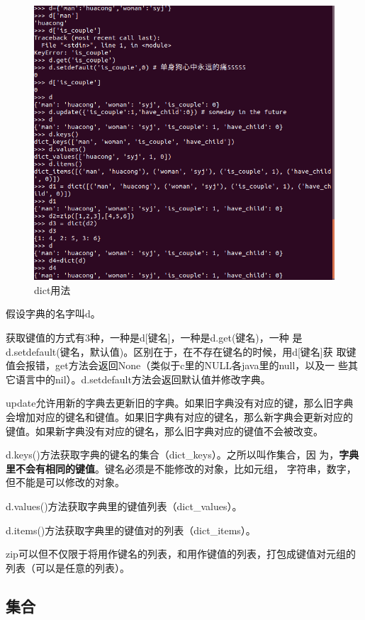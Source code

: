 \documentclass[11pt,UTF8,oneside]{mybook}
\begin{document}
\begin{figure}[htb]
  \centering \includegraphics[width=\textwidth]{./figure/dict.png}
  \caption{dict用法}
  \label{fig:dict}
\end{figure}

假设字典的名字叫d。

获取键值的方式有3种，一种是d[键名]，一种是d.get(键名)，一种
是d.setdefault(键名，默认值)。区别在于，在不存在键名的时候，用d[键名]获
取键值会报错，get方法会返回None（类似于c里的NULL各java里的null，以及一
些其它语言中的nil）。d.setdefault方法会返回默认值并修改字典。

update允许用新的字典去更新旧的字典。如果旧字典没有对应的键，那么旧字典
会增加对应的键名和键值。如果旧字典有对应的键名，那么新字典会更新对应的
键值。如果新字典没有对应的键名，那么旧字典对应的键值不会被改变。

d.keys()方法获取字典的键名的集合（dict\_keys）。之所以叫作集合，因
为，\textbf{字典里不会有相同的键值}。键名必须是不能修改的对象，比如元组，
字符串，数字，但不能是可以修改的对象。

d.values()方法获取字典里的键值列表（dict\_values）。

d.items()方法获取字典里的键值对的列表（dict\_items）。

zip可以但不仅限于将用作键名的列表，和用作键值的列表，打包成键值对元组的
列表（可以是任意的列表）。

\subsection{集合}
\label{sec:set}
\end{document}
